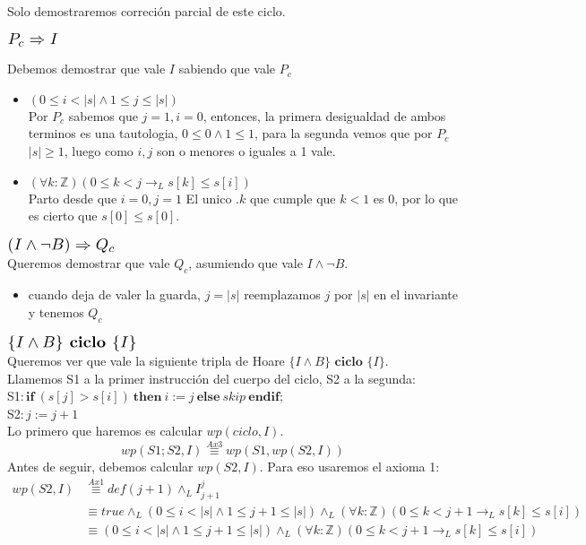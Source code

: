 \documentclass{article}
\begin{document}
\begin{enumerate}[label=\alph*)]
	Solo demostraremos correción parcial de este ciclo.
	\begin{flushleft}$\scalebox{1.3}{$P_c\Rightarrow I$}$\end{flushleft}
	Debemos demostrar que vale $I$ sabiendo que vale $P_c$ 
	\begin{itemize}
		\item $ (0\leq i <|s|\wedge 1\leq j\leq |s|)$\smallskip \\
		Por $P_c$ sabemos que $j=1,i=0$, entonces, la primera desigualdad de ambos terminos es una tautologia,
		$0\leq 0\wedge 1\leq 1$, para la segunda vemos que por $P_c$ $|s|\geq 1$, luego como $i,j$ son o menores o iguales
		a 1 vale.
		\item  $(\forall k:\mathbb{Z})(0\leq k<j\rightarrow_L s[k]\leq s[i])$\\
		Parto desde que $i=0,j=1$
		El unico .$k$ que cumple que $k<1$ es 0, por lo que es cierto que $s[0]\leq s[0]$. 
	\end{itemize}	 
	$\scalebox{1.3}{$(I\wedge \neg B)\Rightarrow Q_c$}$\smallskip \\
	Queremos demostrar que vale $Q_c$, asumiendo que vale  $I\wedge \neg B$.
	\begin{itemize}
	\item cuando deja de valer la guarda, $j=|s|$ reemplazamos $j$ por $|s|$ en el invariante y tenemos $Q_c$
	\end{itemize}
	$\scalebox{1.3}{$\{I\wedge B\} \textbf{ ciclo } \{I\}$}$\medskip \\
	Queremos ver que vale la siguiente tripla de Hoare $\{I\wedge B\} \textbf{ ciclo } \{I\}$.\\
	Llamemos S1 a la primer instrucción del cuerpo del ciclo, S2 a la segunda:\\
	S1$: \textbf{if}\ (s[j]>s[i])\ \textbf{then}\ i:=j\ \textbf{else}\ skip\ \textbf{endif};$\\
	S2$: j:=j+1$\\
	Lo primero que haremos es calcular $wp(ciclo,I)$.
	\begin{equation}wp(S1;S2,I)\stackrel{Ax3}{\equiv}wp(S1,wp(S2,I))\end{equation}
	Antes de seguir, debemos calcular $wp(S2,I)$. Para eso usaremos el axioma 1:
	\begin{align*}
	wp(S2,I)&\stackrel{Ax1}{\equiv}def(j+1)\wedge_L I_{j+1}^{j}\\
		&\equiv true\wedge_L (0\leq i <|s|\wedge 1\leq j+1\leq |s|)\wedge_L (\forall k:\mathbb{Z})(0\leq k<j+1\rightarrow_L s[k]\leq s[i])\\
		&\equiv (0\leq i <|s|\wedge 1\leq j+1\leq |s|)\wedge_L (\forall k:\mathbb{Z})(0\leq k<j+1\rightarrow_L s[k]\leq s[i])
	\end{align*}
	

\end{enumerate}
\end{document}
